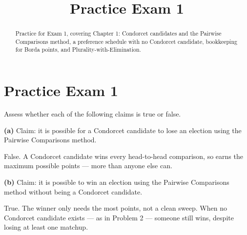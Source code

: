 \documentclass[12pt]{ximera}
\title{Practice Exam 1}
\begin{document}
\begin{abstract}
Practice for Exam 1, covering Chapter 1: Condorcet candidates and the Pairwise
Comparisons method, a preference schedule with no Condorcet candidate, bookkeeping for
Borda points, and Plurality-with-Elimination.
\end{abstract}
\maketitle

\section*{Practice Exam 1}

\begin{problem}
Assess whether each of the following claims is true or false.

\begin{prompt}
\textbf{(a)} Claim: it is possible for a Condorcet candidate to lose an election using
the Pairwise Comparisons method.

\begin{multipleChoice}
\end{multipleChoice}

\begin{feedback}
False. A Condorcet candidate wins every head-to-head comparison, so earns the maximum
possible points --- more than anyone else can.
\end{feedback}
\end{prompt}

\begin{prompt}
\textbf{(b)} Claim: it is possible to win an election using the Pairwise Comparisons
method without being a Condorcet candidate.

\begin{multipleChoice}
\end{multipleChoice}

\begin{feedback}
True. The winner only needs the most points, not a clean sweep. When no Condorcet
candidate exists --- as in Problem 2 --- someone still wins, despite losing at least one
matchup.
\end{feedback}
\end{prompt}
\end{problem}
\end{document}
